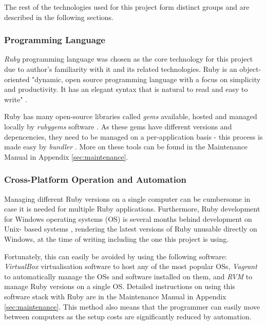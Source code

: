 The rest of the technologies used for this project form distinct groups and are
described in the following sections.

\subsubsection{Programming Language}

\textit{Ruby} programming language was chosen as the core technology for this
project due to author's familiarity with it and its related technologies. Ruby
is an object-oriented "dynamic, open source programming language with a focus
on simplicity and productivity. It has an elegant syntax that is natural to
read and easy to write" \parencite{Ruby}.

Ruby has many open-source libraries called \textit{gems} available, hosted and
managed locally by \textit{rubygems} software \parencite{Rubygems}. As these
gems have different versions and depencencies, they need to be managed on a
per-application basis - this process is made easy by \textit{bundler}
\parencite{Bundler}. More on these tools can be found in the Maintenance Manual
in Appendix \ref{sec:maintenance}.

\subsubsection{Cross-Platform Operation and Automation}

Managing different Ruby versions on a single computer can be cumbersome in case
it is needed for multiple Ruby applications. Furthermore, Ruby development for
Windows operating systems (OS) is several months behind development on Unix-
based systems \parencite{Ruby}, rendering the latest versions of Ruby unusable
directly on Windows, at the time of writing including the one this project is
using.

Fortunately, this can easily be avoided by using the following software:
\textit{VirtualBox} \parencite{Virtualbox} virtualisation software to host any
of the most popular OSs, \textit{Vagrant} \parencite{Vagrant} to automatically
manage the OSs and software installed on them, and \textit{RVM} \parencite{Rvm}
to manage Ruby versions on a single OS. Detailed instructions on using this
software stack with Ruby are in the Maintenance Manual in Appendix
\ref{sec:maintenance}. This method also means that the programmer can easily
move between computers as the setup costs are significantly reduced by
automation.


